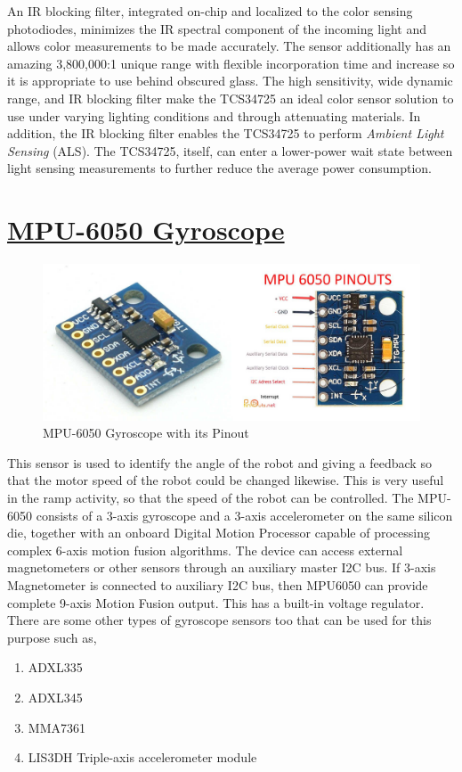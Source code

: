 \documentclass[a4paper,11pt,twocolumn]{article}
\begin{document}
An IR blocking filter, integrated on-chip and localized to the color sensing photodiodes, minimizes the IR spectral component of the incoming light and allows color measurements to be made accurately. The sensor additionally has an amazing 3,800,000:1 unique range with flexible incorporation time and increase so it is appropriate to use behind obscured glass. The high sensitivity, wide dynamic range, and IR blocking filter make the TCS34725 an ideal color sensor solution to use under varying lighting conditions and through attenuating materials. In addition, the IR blocking filter enables the TCS34725 to perform \textit{Ambient Light Sensing} (ALS). The TCS34725, itself, can enter a lower-power wait state between light sensing measurements to further reduce the average power consumption\cite{industries_rgb_nodate}.



\section*{\underline{MPU-6050 Gyroscope}}
\begin{center}
	\begin{figure}[!h]
		\centering
		\includegraphics[scale=0.4]{figures/mpuu}
		\caption{MPU-6050 Gyroscope\cite{noauthor_mpu6050_nodate} with its Pinout\cite{admin_mpu6050_2019}}
	\end{figure}
\end{center}
This sensor is used to identify the angle of the robot and giving a feedback so that the motor speed of the robot could be changed likewise. This is very useful in the ramp activity, so that the speed of the robot can be controlled. The MPU-6050 consists of a 3-axis gyroscope and a 3-axis accelerometer on the same silicon die, together with an onboard Digital Motion Processor capable of processing complex 6-axis motion fusion algorithms. The device can access external magnetometers or other sensors through an auxiliary master I2C bus. If 3-axis Magnetometer is connected to auxiliary I2C bus, then MPU6050 can provide complete 9-axis Motion Fusion output. This has a built-in voltage regulator\cite{noauthor_gyroscope_2019}.\\
There are some other types of gyroscope sensors too that can be used for this purpose such as, 
\begin{enumerate}[1]
	\item ADXL335
	\item ADXL345
	\item MMA7361
	\item LIS3DH Triple-axis accelerometer module
\end{enumerate}
\end{document}
